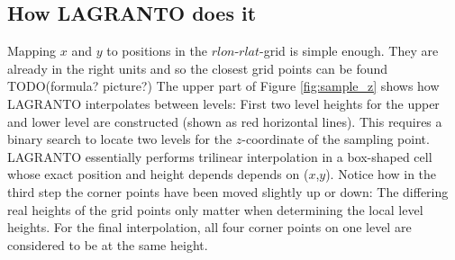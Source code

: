\subsection{How LAGRANTO does it}
Mapping $x$ and $y$ to positions in the $rlon$-$rlat$-grid is simple enough. They are already in the right units and so the closest grid points can be found TODO(formula? picture?)
The upper part of Figure \ref{fig:sample_z} shows how LAGRANTO interpolates between levels: First two level heights for the upper and lower level are constructed (shown as red horizontal lines). This requires a binary search to locate two levels for the $z$-coordinate of the sampling point. LAGRANTO essentially performs trilinear interpolation in a box-shaped cell whose exact position and height depends depends on ($x$,$y$). Notice how in the third step the corner points have been moved slightly up or down: The differing real heights of the grid points only matter when determining the local level heights. For the final interpolation, all four corner points on one level are considered to be at the same height. 



